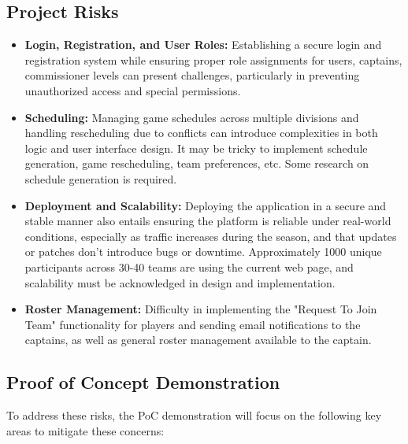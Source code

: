 \documentclass{article}
\begin{document}
\subsection{Project Risks}

\begin{itemize}
  \item \textbf{Login, Registration, and User Roles:} Establishing a secure login and registration system while ensuring proper role assignments for users, captains, commissioner levels can present challenges, particularly in preventing unauthorized access and special permissions.
  \item \textbf{Scheduling:} Managing game schedules across multiple divisions and handling rescheduling due to conflicts can introduce complexities in both logic and user interface design. It may be tricky to implement schedule generation, game rescheduling, team preferences, etc. Some research on schedule generation is required.
  \item \textbf{Deployment and Scalability:} Deploying the application in a secure and stable manner also entails ensuring the platform is reliable under real-world conditions, especially as traffic increases during the season, and that updates or patches don’t introduce bugs or downtime. Approximately 1000 unique participants across 30-40 teams are using the current web page, and scalability must be acknowledged in design and implementation.
  \item \textbf{Roster Management:} Difficulty in implementing the "Request To Join Team" functionality for players and sending email notifications to the captains, as well as general roster management available to the captain.
\end{itemize}
\subsection{Proof of Concept Demonstration}

To address these risks, the PoC demonstration will focus on the following key areas to mitigate these concerns:
\end{document}
